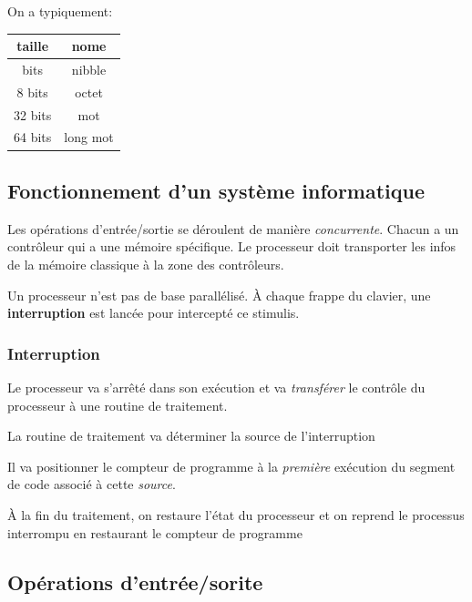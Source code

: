 On a typiquement:

\begin{longtable}[]{@{}cc@{}}
\toprule\noalign{}
taille & nome \\
\midrule\noalign{}
\endhead
\bottomrule\noalign{}
\endlastfoot
4 bits & nibble \\
8 bits & octet \\
32 bits & mot \\
64 bits & long mot \\
\end{longtable}

\subsection{Fonctionnement d'un système
informatique}\label{fonctionnement-dun-systuxe8me-informatique}

Les opérations d'entrée/sortie se déroulent de manière
\emph{concurrente}. Chacun a un contrôleur qui a une mémoire spécifique.
Le processeur doit transporter les infos de la mémoire classique à la
zone des contrôleurs.

Un processeur n'est pas de base parallélisé. À chaque frappe du clavier,
une \textbf{interruption} est lancée pour intercepté ce stimulis.

\subsubsection{Interruption}\label{interruption}

Le processeur va s'arrêté dans son exécution et va \emph{transférer} le
contrôle du processeur à une routine de traitement.

La routine de traitement va déterminer la source de l'interruption

Il va positionner le compteur de programme à la \emph{première}
exécution du segment de code associé à cette \emph{source}.

À la fin du traitement, on restaure l'état du processeur et on reprend
le processus interrompu en restaurant le compteur de programme

\subsection{Opérations
d'entrée/sorite}\label{opuxe9rations-dentruxe9esorite}


